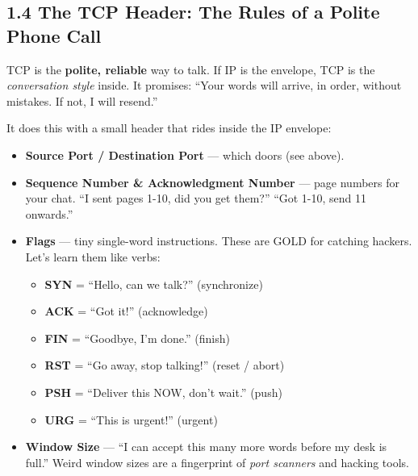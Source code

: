 \documentclass[11pt,a4paper]{article}
\begin{document}
\subsection{1.4 The TCP Header: The Rules of a Polite Phone Call}
\label{sec:tcpheader}

TCP is the \textbf{polite, reliable} way to talk. If IP is the envelope, TCP
is the \emph{conversation style} inside. It promises: ``Your words will arrive,
in order, without mistakes. If not, I will resend.''

It does this with a small header that rides inside the IP envelope:

\begin{itemize}[leftmargin=1.6em,itemsep=2pt]
  \item \textbf{Source Port / Destination Port} --- which doors (see above).
  \item \textbf{Sequence Number \& Acknowledgment Number} --- page numbers for
        your chat. ``I sent pages 1-10, did you get them?'' ``Got 1-10, send
        11 onwards.''
  \item \textbf{Flags} --- tiny single-word instructions. These are GOLD for
        catching hackers. Let's learn them like verbs:
        \begin{itemize}[leftmargin=2.2em,itemsep=1pt]
          \item \textbf{SYN} = ``Hello, can we talk?'' (synchronize)
          \item \textbf{ACK} = ``Got it!'' (acknowledge)
          \item \textbf{FIN} = ``Goodbye, I'm done.'' (finish)
          \item \textbf{RST} = ``Go away, stop talking!'' (reset / abort)
          \item \textbf{PSH} = ``Deliver this NOW, don't wait.'' (push)
          \item \textbf{URG} = ``This is urgent!'' (urgent)
        \end{itemize}
  \item \textbf{Window Size} --- ``I can accept this many more words before my
        desk is full.'' Weird window sizes are a fingerprint of
        \emph{port scanners} and hacking tools.
\end{itemize}
\end{document}
